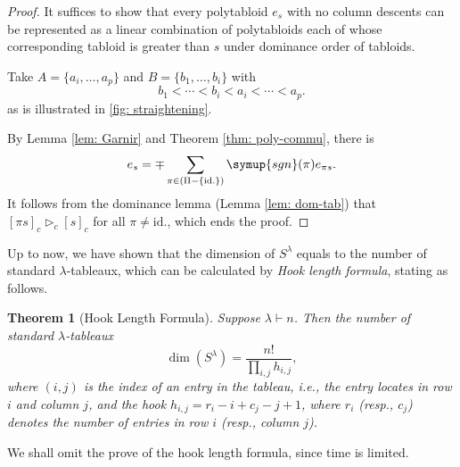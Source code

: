 \documentclass{assignment}[2019/10/15]
\theoremstyle{plain}
\newtheorem{theorem}{Theorem}[section]
\newcommand{\sgn}{\mathop{}\!\symup{sgn}}
\newcommand{\id}{\text{id.}}
\begin{document}
    \begin{proof}
        It suffices to show that every polytabloid $e_s$ with no column descents can be represented as a linear combination of polytabloids each of whose corresponding tabloid is greater than $s$ under dominance order of tabloids.

        Take $A=\{a_i, \dotsc, a_p\}$ and $B = \{b_1, \dotsc, b_i\}$ with
        \begin{equation}
            b_1<\dotsb <b_i<a_i<\dotsb <a_p.
        \end{equation}
        as is illustrated in \ref{fig: straightening}.

        By Lemma \ref{lem: Garnir} and Theorem \ref{thm: poly-commu}, there is
        \begin{equation}
            e_s = \mp\sum_{\pi\in(\Pi-\{\id\})}\sgn(\pi)e_{\pi s}.
        \end{equation}
        It follows from the dominance lemma (Lemma \ref{lem: dom-tab}) that $[\pi s]_c\rhd_c[s]_c$ for all $\pi\neq \id$, which ends the proof.
    \end{proof}

    Up to now, we have shown that the dimension of $S^\lambda$ equals to the number of standard $\lambda$-tableaux, which can be calculated by \emph{Hook length formula}, stating as follows.

    \begin{theorem}[Hook Length Formula]
        Suppose $\lambda\vdash n$. Then the number of standard $\lambda$-tableaux
        \begin{equation}
            \dim(S^\lambda)=\frac{n!}{\prod_{i, j}h_{i, j}},
        \end{equation}
        where $(i, j)$ is the index of an entry in the tableau, i.e., the entry locates in row $i$ and column $j$, and the hook $h_{i, j} = r_i - i + c_j-j + 1$, where $r_i$ (resp., $c_j$) denotes the number of entries in row $i$ (resp., column $j$).
    \end{theorem}

    We shall omit the prove of the hook length formula, since time is limited.
\end{document}
